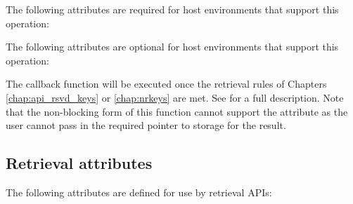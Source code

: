 \divider

The following attributes are required for host environments that support this operation:


\reqattrend

\optattrstart
The following attributes are optional for host environments that support this operation:


\optattrend

\descr

The callback function will be executed once the retrieval rules of Chapters \ref{chap:api_rsvd_keys} or \ref{chap:nrkeys} are met.
See  for a full description. Note that the non-blocking form of this function cannot support the  attribute as the user cannot pass in the required pointer to storage for the result.


\subsection{Retrieval attributes}
\label{chap:api_kg:attr}

The following attributes are defined for use by retrieval \acp{API}:

